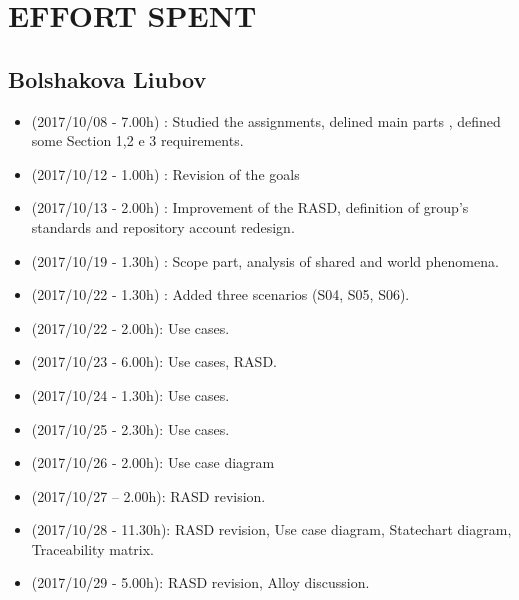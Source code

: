 \documentclass[a4paper,leqno]{book}
\begin{document}
\chapter{EFFORT SPENT}

\section{Bolshakova Liubov}
\begin{itemize}
\item (2017/10/08 - 7.00h) : Studied the assignments, delined main parts , defined some Section 1,2 e 3 requirements.
\item (2017/10/12 - 1.00h) : Revision of the goals 
\item (2017/10/13 - 2.00h) : Improvement of the RASD, definition of group's standards and repository account redesign.
\item (2017/10/19 - 1.30h) : Scope part, analysis of shared and world phenomena.
\item (2017/10/22 - 1.30h) : Added three scenarios (S04, S05, S06).
\item (2017/10/22 - 2.00h): Use cases.
\item (2017/10/23 - 6.00h): Use cases, RASD. 
\item (2017/10/24 - 1.30h): Use cases.
\item (2017/10/25 - 2.30h): Use cases.
\item (2017/10/26 - 2.00h): Use case diagram
\item (2017/10/27 – 2.00h): RASD revision.
\item (2017/10/28 - 11.30h): RASD revision, Use case diagram, Statechart diagram, Traceability matrix.
\item (2017/10/29 - 5.00h): RASD revision, Alloy discussion.
\end{itemize}
\end{document}
